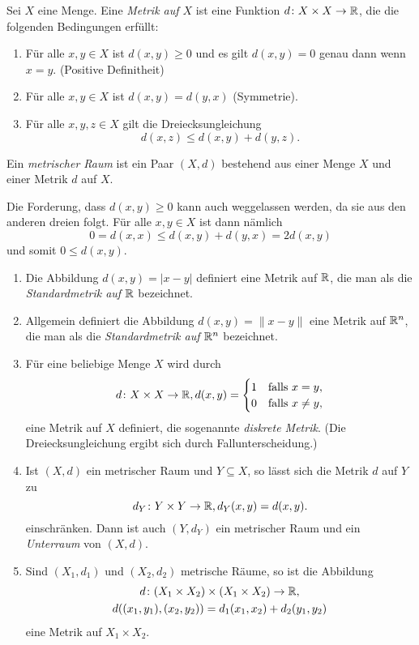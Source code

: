 \documentclass[a4paper,10pt]{article}
\begin{document}
\begin{defi}
 Sei $X$ eine Menge. Eine \emph{Metrik auf $X$} ist eine Funktion $d \colon X \times X \to \mathbb{R}$, die die folgenden Bedingungen erfüllt:
 \begin{enumerate}
  \item
   Für alle $x,y \in X$ ist $d(x,y) \geq 0$ und es gilt $d(x,y) = 0$ genau dann wenn $x = y$. (Positive Definitheit)
  \item
   Für alle $x,y \in X$ ist $d(x,y) = d(y,x)$ (Symmetrie).
  \item
   Für alle $x,y,z \in X$ gilt die Dreiecksungleichung
   \[
    d(x,z) \leq d(x,y) + d(y,z).
   \]
 \end{enumerate}
 
 Ein \emph{metrischer Raum} ist ein Paar $(X,d)$ bestehend aus einer Menge $X$ und einer Metrik $d$ auf $X$.
\end{defi}


\begin{bem}
 Die Forderung, dass $d(x,y) \geq 0$ kann auch weggelassen werden, da sie aus den anderen dreien folgt. Für alle $x,y \in X$ ist dann nämlich
 \[
  0 = d(x,x) \leq d(x,y) + d(y,x) = 2 d(x,y)
 \]
 und somit $0 \leq d(x,y)$.
\end{bem}


\begin{bsp}
 \begin{enumerate}
  \item
   Die Abbildung $d(x,y) = |x-y|$ definiert eine Metrik auf $\mathbb{R}$, die man als die \emph{Standardmetrik auf $\mathbb{R}$} bezeichnet.
  \item
   Allgemein definiert die Abbildung $d(x,y) = \|x-y\|$ eine Metrik auf $\mathbb{R}^n$, die man als die \emph{Standardmetrik auf $\mathbb{R}^n$} bezeichnet.
  \item
   Für eine beliebige Menge $X$ wird durch
   \[
    d \colon X \times X \to \mathbb{R},
    d(x,y) =
    \begin{cases}
     1 & \text{falls $x = y$}, \\
     0 & \text{falls $x \neq y$},
    \end{cases}
   \]
   eine Metrik auf $X$ definiert, die sogenannte \emph{diskrete Metrik}. (Die Dreiecksungleichung ergibt sich durch Fallunterscheidung.)
  \item
   Ist $(X,d)$ ein metrischer Raum und $Y \subseteq X$, so lässt sich die Metrik $d$ auf $Y$ zu
   \[
    d_Y \colon Y \times Y \to \mathbb{R}, d_Y(x,y) = d(x,y).
   \]
   einschränken. Dann ist auch $(Y,d_Y)$ ein metrischer Raum und ein \emph{Unterraum} von $(X,d)$.
  \item
   Sind $(X_1, d_1)$ und $(X_2, d_2)$ metrische Räume, so ist die Abbildung
   \begin{gather*}
    d \colon (X_1 \times X_2) \times (X_1 \times X_2) \to \mathbb{R}, \\
    d((x_1, y_1), (x_2, y_2)) = d_1(x_1, x_2) + d_2(y_1, y_2)
   \end{gather*}
   eine Metrik auf $X_1 \times X_2$.
 \end{enumerate}
\end{bsp}
\end{document}
